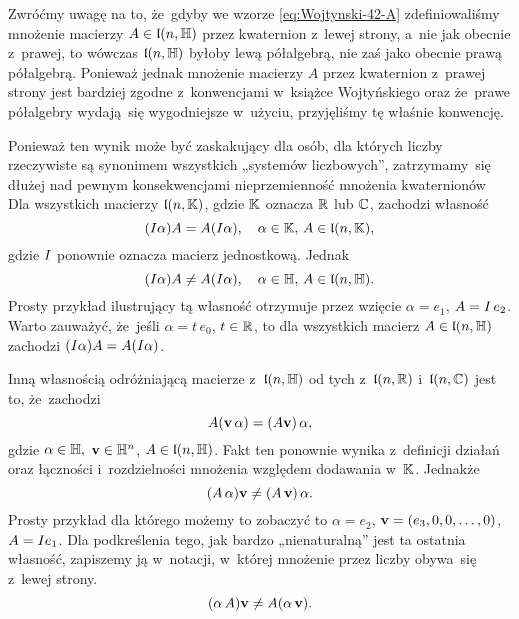 \documentclass[a4paper,11pt]{article}
\begin{document}
Zwróćmy uwagę na to, że~gdyby we wzorze \eqref{eq:Wojtynski-42-A}
zdefiniowaliśmy mnożenie macierzy $A \in \mathfrak{l}( n, \mathbb{H} )$ przez kwaternion
z~lewej strony, a~nie jak obecnie z~prawej, to wówczas $\mathfrak{l}( n, \mathbb{H} )$
byłoby lewą półalgebrą, nie zaś jako obecnie prawą półalgebrą. Ponieważ
jednak mnożenie macierzy $A$ przez kwaternion z~prawej strony jest bardziej
zgodne z~konwencjami w~książce Wojtyńskiego oraz że~prawe półalgebry
wydają~się wygodniejsze w~użyciu, przyjęliśmy tę właśnie konwencję.

Ponieważ ten wynik może być zaskakujący dla osób, dla których liczby
rzeczywiste są synonimem wszystkich „systemów liczbowych”, zatrzymamy~się
dłużej nad pewnym konsekwencjami nieprzemienność mnożenia kwaternionów Dla
wszystkich macierzy $\mathfrak{l}( n, \mathbb{K} )$, gdzie $\mathbb{K}$ oznacza $\mathbb{R}$ lub
$\mathbb{C}$, zachodzi własność
\begin{equation}
  \label{eq:Wojtynski-53}
  ( I \alpha ) A = A ( I \alpha ), \quad
  \alpha \in \mathbb{K}, \, A \in \mathfrak{l}( n, \mathbb{K} ),
\end{equation}
gdzie $I$ ponownie oznacza macierz jednostkową. Jednak
\begin{equation}
  \label{eq:Wojtynski-54}
  ( I \alpha ) A \neq A ( I \alpha ), \quad
  \alpha \in \mathbb{H}, \, A \in \mathfrak{l}( n, \mathbb{H} ).
\end{equation}
Prosty przykład ilustrujący tą własność otrzymuje przez wzięcie
$\alpha = e_{ 1 }$, $A = I \, e_{ 2 }$. Warto zauważyć, że~jeśli
$\alpha = t \, e_{ 0 }$, $t \in \mathbb{R}$, to dla wszystkich macierz
$A \in \mathfrak{l}( n, \mathbb{H} )$ zachodzi $( I \alpha ) A = A ( I \alpha )$.

Inną własnością odróżniającą macierze z~$\mathfrak{l}( n, \mathbb{H} )$ od tych
z~$\mathfrak{l}( n, \mathbb{R} )$ i~$\mathfrak{l}( n, \mathbb{C} )$ jest to,
że~zachodzi
\begin{equation}
  \label{eq:Wojtynski-55}
  A ( \mathbf{v} \, \alpha ) = ( A \mathbf{v} ) \, \alpha,
\end{equation}
gdzie $\alpha \in \mathbb{H},$ $\mathbf{v} \in \mathbb{H}^{ n }$, $A \in \mathfrak{l}( n, \mathbb{H} )$. Fakt
ten ponownie wynika z~definicji działań oraz łączności i~rozdzielności
mnożenia
względem dodawania w~$\mathbb{K}$. Jednakże
\begin{equation}
  \label{eq:Wojtynski-56}
  ( A \, \alpha ) \mathbf{v} \neq ( A \, \mathbf{v} ) \, \alpha.
\end{equation}
Prosty przykład dla którego możemy to zobaczyć to $\alpha = e_{ 2 }$,
$\mathbf{v} = ( e_{ 3 }, 0, 0, \ldots, 0 )$, $A = I e_{ 1 }$. Dla
podkreślenia tego,
jak bardzo „nienaturalną” jest ta ostatnia własność, zapiszemy ją
w~notacji, w~której mnożenie przez liczby obywa~się z~lewej strony.
\begin{equation}
  \label{eq:Wojtynski-57}
  ( \alpha \, A ) \mathbf{v} \neq A ( \alpha \, \mathbf{v} ).
\end{equation}
\end{document}
